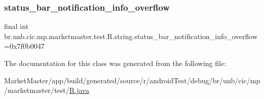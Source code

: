 \mbox{\label{classbr_1_1unb_1_1cic_1_1mp_1_1marketmaster_1_1test_1_1R_1_1string_a3f7125db7ba633c057c535f686e12169}} 
\subsubsection{\texorpdfstring{status\+\_\+bar\+\_\+notification\+\_\+info\+\_\+overflow}{status\_bar\_notification\_info\_overflow}}
{\footnotesize\ttfamily final int br.\+unb.\+cic.\+mp.\+marketmaster.\+test.\+R.\+string.\+status\+\_\+bar\+\_\+notification\+\_\+info\+\_\+overflow =0x7f0b0047\hspace{0.3cm}{\ttfamily [static]}}



The documentation for this class was generated from the following file\+:\begin{DoxyCompactItemize}
\item 
Market\+Master/app/build/generated/source/r/android\+Test/debug/br/unb/cic/mp/marketmaster/test/\mbox{\hyperlink{androidTest_2debug_2br_2unb_2cic_2mp_2marketmaster_2test_2R_8java}{R.\+java}}\end{DoxyCompactItemize}
